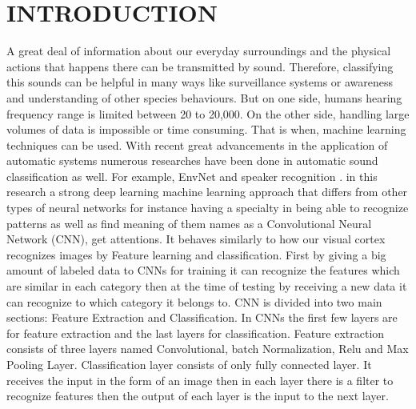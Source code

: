 \documentclass[conference]{IEEEtran}
\begin{document}
\section{INTRODUCTION}
A great deal of information about our everyday surroundings and the physical actions that happens there can be transmitted by sound. Therefore, classifying this sounds can be helpful in many ways like surveillance systems or awareness and understanding of other species behaviours. But on one side, humans hearing frequency range is limited between 20 to 20,000. On the other side, handling large volumes of data is impossible or time consuming. That is when, machine learning techniques can be used. With recent great advancements in the application of automatic systems numerous researches have been done in automatic sound classification as well. For example, EnvNet \cite{b1} and speaker recognition \cite{b2}. in this research a strong deep learning machine learning approach that differs from other types of neural networks for instance having a specialty in being able to recognize patterns as well as find meaning of them names as a Convolutional Neural Network (CNN), get attentions. It behaves similarly to how our visual cortex recognizes images by Feature learning and classification. First by giving a big amount of labeled data to CNNs for training it can recognize the features which are similar in each category then at the time of testing by receiving a new data it can recognize to which category it belongs to. CNN is divided into two main sections: Feature Extraction and Classification. In CNNs the first few layers are for feature extraction and the last layers for classification. Feature extraction consists of three layers named Convolutional, batch Normalization, Relu  and Max Pooling Layer. Classification layer consists of only fully connected layer. It receives the input in the form of an image then in each layer there is a filter to recognize features then the output of each layer is the input to the next layer. 
\end{document}
